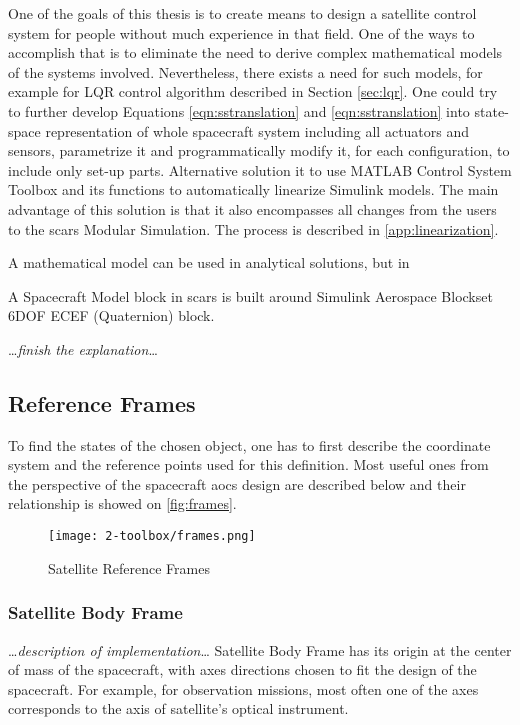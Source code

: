     One of the goals of this thesis is to create means to design a satellite control system for people without much experience in that field. One of the ways to accomplish that is to eliminate the need to derive complex mathematical models of the systems involved. Nevertheless, there exists a need for such models, for example for LQR control algorithm described in Section \ref{sec:lqr}. One could try to further develop Equations \ref{eqn:sstranslation} and \ref{eqn:sstranslation} into state-space representation of whole spacecraft system including all actuators and sensors, parametrize it and programmatically modify it, for each configuration, to include only set-up parts. Alternative solution it to use MATLAB Control System Toolbox and its functions to automatically linearize Simulink models. The main advantage of this solution is that it also encompasses all changes from the users to the \ac{scars} Modular Simulation. The process is described in \autoref{app:linearization}.

    A mathematical model can be used in analytical solutions, but in 
    
    A Spacecraft Model block in \ac{scars} is built around Simulink Aerospace Blockset 6DOF ECEF (Quaternion) block.

    \dots\textit{finish the explanation}\dots

\subsection{Reference Frames}
    To find the states of the chosen object, one has to first describe the coordinate system and the reference points used for this definition. Most useful ones from the perspective of the spacecraft \ac{aocs} design are described below and their relationship is showed on \autoref{fig:frames}.

    \begin{figure}[H]
        \centering
        \texttt{[image: 2-toolbox/frames.png]}
        \caption{Satellite Reference Frames\cite{6ecef-frames}}
        \label{fig:frames}
    \end{figure}

    \subsubsection{Satellite Body Frame}
        \dots\textit{description of implementation}\dots
        Satellite Body Frame has its origin at the center of mass of the spacecraft, with axes directions chosen to fit the design of the spacecraft. For example, for observation missions, most often one of the axes corresponds to the axis of satellite's optical instrument.

